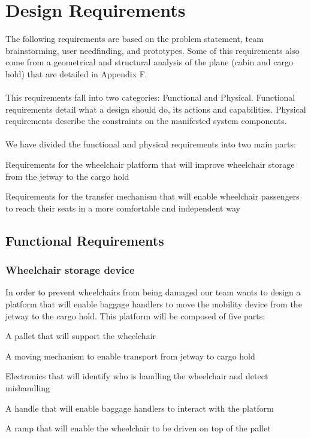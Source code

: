 \chapter{Design Requirements}

The following requirements are based on the problem statement, team brainstorming, user needfinding, and prototypes. Some of this requirements also come from a geometrical and structural analysis of the plane (cabin and cargo hold) that are detailed in Appendix F.
\\
\\This requirements fall into two categories: Functional and Physical. Functional requirements detail what a design should do, its actions and capabilities. Physical requirements describe the constraints on the manifested system components. 
\\
\\ We have divided the functional and physical requirements into two main parts:
\begin{list}{-}{}
  \item Requirements for the wheelchair platform that will improve wheelchair storage from the jetway to the cargo hold
  \item Requirements for the transfer mechanism that will enable wheelchair passengers to reach their seats in a more comfortable and independent way
\end{list} 

\section{Functional Requirements}

\subsection*{Wheelchair storage device}

In order to prevent wheelchairs from being damaged our team wants to design a platform that will enable baggage handlers to move the mobility device from the jetway to the cargo hold. This platform will be composed of five parts:

\begin{list}{-}{}
  \item A pallet that will support the wheelchair
  \item A moving mechanism to enable transport from jetway to cargo hold
  \item Electronics that will identify who is handling the wheelchair and detect mishandling
  \item A handle that will enable baggage handlers to interact with the platform
  \item A ramp that will enable the wheelchair to be driven on top of the pallet
\end{list}

